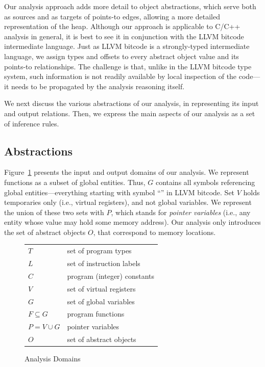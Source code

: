 Our analysis approach adds more detail to object abstractions, which
serve both as sources and as targets of points-to edges, allowing a
more detailed representation of the heap. Although our approach is
applicable to C/C++ analysis in general, it is best to see it in
conjunction with the LLVM bitcode intermediate language. Just as LLVM
bitcode is a strongly-typed intermediate language, we assign types and
offsets to every abstract object value and its points-to
relationships. The challenge is that, unlike in the LLVM bitcode type
system, such information is not readily available by local inspection
of the code---it needs to be propagated by the analysis reasoning
itself.

We next discuss the various abstractions of our analysis, in
representing its input and output relations. Then, we express the main
aspects of our analysis as a set of inference rules.

\subsection{Abstractions}
\label{structsens/sect/abstractions}

Figure~\ref{structsens/fig/domains} presents the input and output
domains of our analysis. We represent functions as a subset of global
entities. Thus, $G$ contains all symbols referencing global
entities---everything starting with symbol ``'' in LLVM
bitcode. Set $V$ holds temporaries only (i.e., virtual registers), and
not global variables. We represent the union of these two sets with
$P$, which stands for \emph{pointer variables} (i.e., any entity whose
value may hold some memory address). Our analysis only introduces the
set of abstract objects $O$, that correspond to memory locations.

\begin{figure}[ht]
  \centering
  \begin{tabular}{l@{\quad}l}
    \toprule
    $T$ & set of program types \\
    $L$ & set of instruction labels \\
    $C$ & program (integer) constants \\
    $V$ & set of virtual registers \\
    $G$ & set of global variables \\
    $F \subseteq G$ & program functions \\
    $P = V \cup G$ & pointer variables \\
    \midrule
    $O$ & set of abstract objects \\
    \bottomrule
  \end{tabular}
  \caption{Analysis Domains}
  \label{structsens/fig/domains}
\end{figure}


